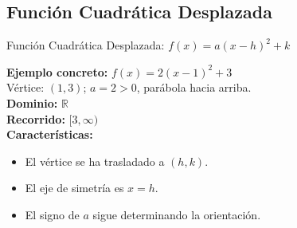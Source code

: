 \documentclass[12pt,a4paper]{article}
\begin{document}
\subsection{Función Cuadrática Desplazada}
\begin{funcbox}{Función Cuadrática Desplazada: $f(x)=a(x-h)^2+k$}
\begin{minipage}[t]{0.55\textwidth}
    \textbf{Ejemplo concreto:} $f(x)=2(x-1)^2+3$\\
    Vértice: $(1,3)$; $a=2>0$, parábola hacia arriba.\\
    \textbf{Dominio:} $\mathbb{R}$\\
    \textbf{Recorrido:} $[3,\infty)$\\
    \textbf{Características:}
    \begin{itemize}
        \item El vértice se ha trasladado a $(h,k)$.
        \item El eje de simetría es $x=h$.
        \item El signo de $a$ sigue determinando la orientación.
    \end{itemize}
\end{minipage}\hfill
\begin{minipage}[t]{0.4\textwidth}
    \centering
\end{minipage}
\end{funcbox}

\end{document}
